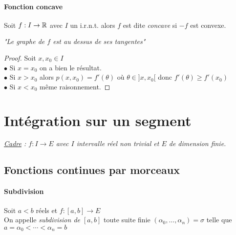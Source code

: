     
    \traitd
    \paragraph{Fonction concave}
        Soit $f:I\rightarrow {\mathbb{R}}$ avec $I$ un i.r.n.t. alors $f$ est dite \emph{concave} si $-f$ est convexe. 
    \trait
    
    
	\textit{"Le graphe de $f$ est au dessus de ses tangentes"}
    
    \begin{proof}
    Soit $x,x_0 \in I$ \\$\bullet$ Si $x=x_0$ on a bien le résultat.\\ $\bullet$ Si $x>x_0$ alors $p(x,x_0) = f'(\theta )$ où 
    $\theta \in ]x,x_0[$ donc $f'(\theta ) \geqslant f'(x_0)$ \\ $\bullet$ Si $x<x_0$ même raisonnement.
    \end{proof} \medskip
    
    
\section{Intégration sur un segment}

    \textit{\underline{Cadre} : $f:I\rightarrow E$ avec $I$ intervalle réel non trivial et $E$ de dimension \emph{finie}.}
	
	\subsection{Fonctions continues par morceaux}
    	
    	\vspace{-15pt}
    	\traitd
    	\paragraph{Subdivision}
        		Soit $a<b$ réels et $f:[a,b]\rightarrow E$ \\ 
        		On appelle \emph{subdivision de $[a,b]$} toute suite finie $(\alpha_0 , \dots , \alpha_n ) = \sigma$ telle que $a=\alpha_0 < \cdots <\alpha_n = b$
        \trait

